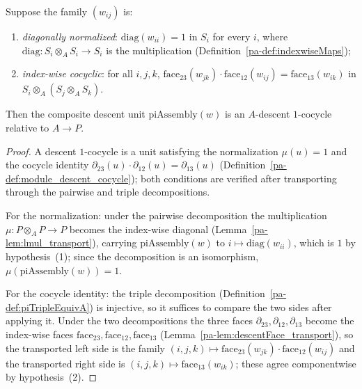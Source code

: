 \begin{theorem}
  \label{pa-thm:isDescentCocycle_piAssemblyUnit}
  \leanok

  Suppose the family \((w_{ij})\) is:
  \begin{enumerate}
    \item \emph{diagonally normalized}: \(\mathrm{diag}(w_{ii}) = 1\) in \(S_i\) for every
      \(i\), where \(\mathrm{diag} \colon S_i \otimes_A S_i \to S_i\) is the multiplication
      (Definition~\ref{pa-def:indexwiseMaps});
    \item \emph{index-wise cocyclic}: for all \(i, j, k\),
      \(\mathrm{face}_{23}(w_{jk}) \cdot \mathrm{face}_{12}(w_{ij}) =
      \mathrm{face}_{13}(w_{ik})\) in \(S_i \otimes_A (S_j \otimes_A S_k)\).
  \end{enumerate}
  Then the composite descent unit \(\mathrm{piAssembly}(w)\) is an \(A\)-descent
  \(1\)-cocycle relative to \(A \to P\).
\end{theorem}
\begin{proof}
  \leanok
  A descent \(1\)-cocycle is a unit satisfying the normalization \(\mu(u) = 1\) and the
  cocycle identity \(\partial_{23}(u) \cdot \partial_{12}(u) = \partial_{13}(u)\)
  (Definition~\ref{pa-def:module_descent_cocycle}); both conditions are verified after
  transporting through the pairwise and triple decompositions.

  For the normalization: under the pairwise decomposition the multiplication
  \(\mu \colon P \otimes_A P \to P\) becomes the index-wise diagonal
  (Lemma~\ref{pa-lem:lmul_transport}), carrying \(\mathrm{piAssembly}(w)\) to
  \(i \mapsto \mathrm{diag}(w_{ii})\), which is \(1\) by hypothesis~(1); since the
  decomposition is an isomorphism, \(\mu(\mathrm{piAssembly}(w)) = 1\).

  For the cocycle identity: the triple decomposition (Definition~\ref{pa-def:piTripleEquivA})
  is injective, so it suffices to compare the two sides after applying it. Under the two
  decompositions the three faces \(\partial_{23}, \partial_{12}, \partial_{13}\) become the
  index-wise faces \(\mathrm{face}_{23}, \mathrm{face}_{12}, \mathrm{face}_{13}\)
  (Lemma~\ref{pa-lem:descentFace_transport}), so the transported left side is the family
  \((i,j,k) \mapsto \mathrm{face}_{23}(w_{jk}) \cdot \mathrm{face}_{12}(w_{ij})\) and the
  transported right side is \((i,j,k) \mapsto \mathrm{face}_{13}(w_{ik})\); these agree
  componentwise by hypothesis~(2).
\end{proof}


